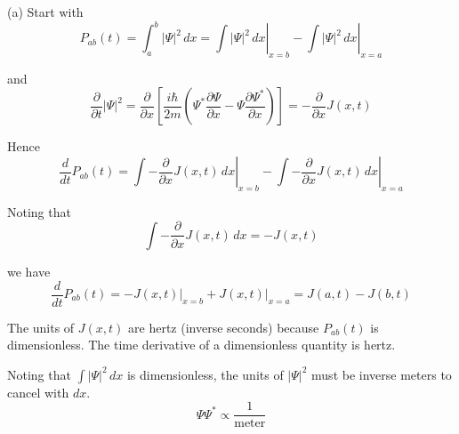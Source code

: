 


\bigskip
(a) Start with
\begin{equation*}
P_{ab}(t)=\int_a^b|\Psi|^2\,dx
=\left.\int|\Psi|^2\,dx\right|_{x=b}
-\left.\int|\Psi|^2\,dx\right|_{x=a}
\end{equation*}

and
\begin{equation*}
\frac{\partial}{\partial t}|\Psi|^2=\frac{\partial}{\partial x}
\left[
\frac{i\hbar}{2m}
\left(\Psi^*\frac{\partial\Psi}{\partial x}-\Psi\frac{\partial\Psi^*}{\partial x}\right)
\right]
=-\frac{\partial}{\partial x}J(x,t)
\end{equation*}

Hence
\begin{equation*}
\frac{d}{dt}P_{ab}(t)
=\left.\int-\frac{\partial}{\partial x}J(x,t)\,dx\right|_{x=b}
-\left.\int-\frac{\partial}{\partial x}J(x,t)\,dx\right|_{x=a}
\end{equation*}

Noting that
\begin{equation*}
\int-\frac{\partial}{\partial x}J(x,t)\,dx
=-J(x,t)
\end{equation*}

we have
\begin{equation*}
\frac{d}{dt}P_{ab}(t)
=-J(x,t)\bigg|_{x=b}+J(x,t)\bigg|_{x=a}
=J(a,t)-J(b,t)
\end{equation*}

The units of $J(x,t)$ are hertz (inverse seconds) because $P_{ab}(t)$ is dimensionless.
The time derivative of a dimensionless quantity is hertz.

\bigskip
Noting that $\int|\Psi|^2\,dx$ is dimensionless, the units of $|\Psi|^2$ must be inverse meters
to cancel with $dx$.
\begin{equation*}
\Psi\Psi^*\propto\frac{1}{\text{meter}}
\end{equation*}

